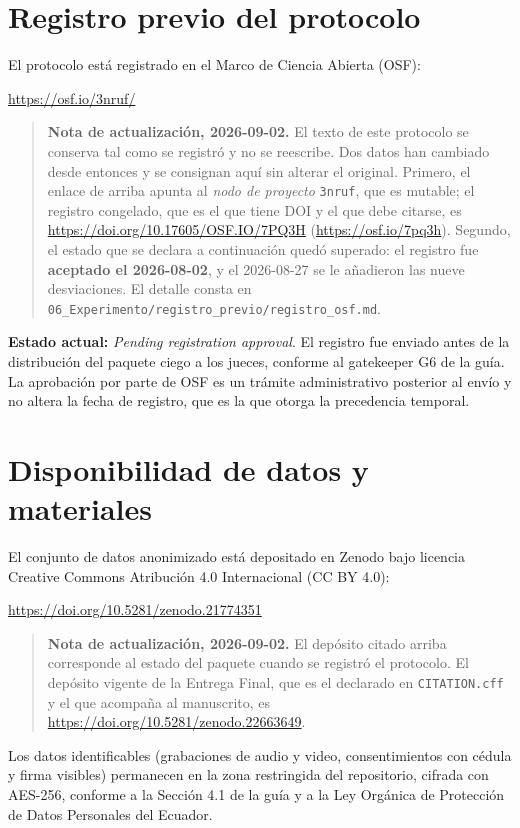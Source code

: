 \documentclass[11pt,a4paper]{article}
\begin{document}
\section{Registro previo del protocolo}
El protocolo está registrado en el Marco de Ciencia Abierta (OSF):

\begin{center}
\url{https://osf.io/3nruf/}
\end{center}

\begin{quote}\small
\textbf{Nota de actualizaci\'on, 2026-09-02.} El texto de este protocolo se conserva
tal como se registr\'o y no se reescribe. Dos datos han cambiado desde entonces y se
consignan aqu\'i sin alterar el original. Primero, el enlace de arriba apunta al
\emph{nodo de proyecto} \texttt{3nruf}, que es mutable; el registro congelado, que es
el que tiene DOI y el que debe citarse, es
\url{https://doi.org/10.17605/OSF.IO/7PQ3H} (\url{https://osf.io/7pq3h}). Segundo, el
estado que se declara a continuaci\'on qued\'o superado: el registro fue
\textbf{aceptado el 2026-08-02}, y el 2026-08-27 se le a\~nadieron las nueve
desviaciones. El detalle consta en
\texttt{06\_Experimento/registro\_previo/registro\_osf.md}.
\end{quote}

\textbf{Estado actual:} \emph{Pending registration approval}. El registro fue
enviado antes de la distribución del paquete ciego a los jueces, conforme al
gatekeeper G6 de la guía. La aprobación por parte de OSF es un trámite administrativo
posterior al envío y no altera la fecha de registro, que es la que otorga la
precedencia temporal.

\section{Disponibilidad de datos y materiales}
El conjunto de datos anonimizado está depositado en Zenodo bajo licencia Creative
Commons Atribución 4.0 Internacional (CC BY 4.0):

\begin{center}
\url{https://doi.org/10.5281/zenodo.21774351}
\end{center}

\begin{quote}\small
\textbf{Nota de actualizaci\'on, 2026-09-02.} El dep\'osito citado arriba corresponde
al estado del paquete cuando se registr\'o el protocolo. El dep\'osito vigente de la
Entrega Final, que es el declarado en \texttt{CITATION.cff} y el que acompa\~na al
manuscrito, es \url{https://doi.org/10.5281/zenodo.22663649}.
\end{quote}

Los datos identificables (grabaciones de audio y video, consentimientos con cédula y
firma visibles) permanecen en la zona restringida del repositorio, cifrada con
AES-256, conforme a la Sección 4.1 de la guía y a la Ley Orgánica de Protección de
Datos Personales del Ecuador.
\end{document}
